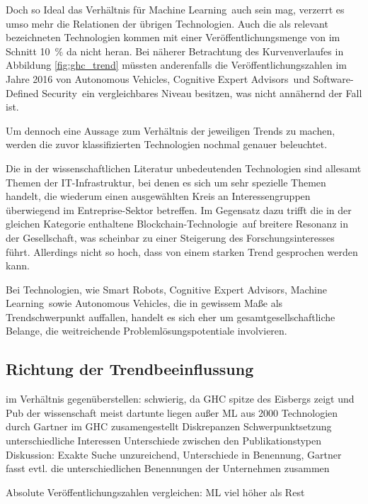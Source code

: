 Doch so Ideal das Verhältnis für \glqq Machine Learning\grqq~auch sein mag, verzerrt es umso mehr die Relationen der übrigen Technologien. Auch die als relevant bezeichneten Technologien kommen mit einer Veröffentlichungsmenge von im Schnitt 10~\% da nicht heran. Bei näherer Betrachtung des Kurvenverlaufes in Abbildung \ref{fig:ghc_trend} müssten anderenfalls die Veröffentlichungszahlen im Jahre 2016 von \glqq Autonomous Vehicles\grqq, \glqq Cognitive Expert Advisors\grqq~und \glqq Software-Defined Security\grqq~ein vergleichbares Niveau besitzen, was nicht annähernd der Fall ist.

Um dennoch eine Aussage zum Verhältnis der jeweiligen Trends zu machen, werden die zuvor klassifizierten Technologien nochmal genauer beleuchtet.

Die in der wissenschaftlichen Literatur unbedeutenden Technologien sind allesamt Themen der IT-Infrastruktur, bei denen es sich um sehr spezielle Themen handelt, die wiederum einen ausgewählten Kreis an Interessengruppen überwiegend im Entreprise-Sektor betreffen. Im Gegensatz dazu trifft die in der gleichen Kategorie enthaltene \glqq Blockchain-Technologie\grqq~auf breitere Resonanz in der Gesellschaft, was scheinbar zu einer Steigerung des Forschungsinteresses führt. Allerdings nicht so hoch, dass von einem starken Trend gesprochen werden kann.

Bei Technologien, wie \glqq Smart Robots\grqq, \glqq Cognitive Expert Advisors\grqq, \glqq Machine Learning\grqq~sowie \glqq Autonomous Vehicles\grqq, die in gewissem Maße als Trendschwerpunkt auffallen, handelt es sich eher um gesamtgesellschaftliche Belange, die weitreichende Problemlösungspotentiale involvieren.

\subsection{Richtung der Trendbeeinflussung}

im Verhältnis gegenüberstellen: schwierig, da GHC spitze des Eisbergs zeigt und Pub der wissenschaft meist dartunte liegen außer ML
aus 2000 Technologien durch Gartner im GHC zusamengestellt
Diskrepanzen Schwerpunktsetzung
unterschiedliche Interessen
Unterschiede zwischen den Publikationstypen
Diskussion:
Exakte Suche unzureichend, Unterschiede in Benennung, Gartner fasst evtl. die unterschiedlichen Benennungen der Unternehmen zusammen

Absolute Veröffentlichungszahlen vergleichen: ML viel höher als Rest


